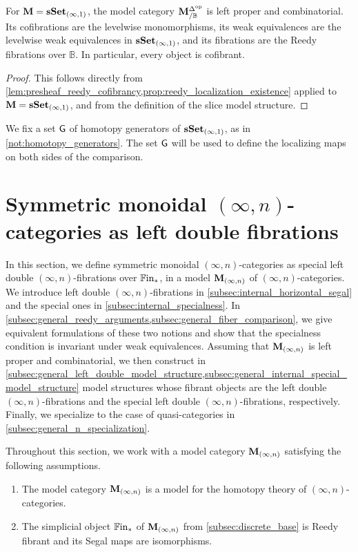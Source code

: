 \documentclass[10pt,reqno]{amsart}
\begin{document}
\begin{proposition}
\label{prop:reedy_quasicategorical_ambient}
For $\mathbf M=\mathbf{sSet}_{(\infty,1)}$, the model category
$\mathbf M^{\Delta^{\mathrm{op}}}_{/\mathbb B}$ is left proper and combinatorial. Its cofibrations
are the levelwise monomorphisms, its weak equivalences are the levelwise
weak equivalences in $\mathbf{sSet}_{(\infty,1)}$, and its fibrations are
the Reedy fibrations over $\mathbb B$. In particular, every object
is cofibrant.
\end{proposition}
\begin{proof}
This follows directly from
\cref{lem:presheaf_reedy_cofibrancy,prop:reedy_localization_existence}
applied to $\mathbf M=\mathbf{sSet}_{(\infty,1)}$, and from the definition
of the slice model structure.
\end{proof}

\begin{notation}
\label{not:joyal_homotopy_generators}
We fix a set $\mathsf G$ of homotopy generators of
$\mathbf{sSet}_{(\infty,1)}$, as in \cref{not:homotopy_generators}. The set
$\mathsf G$ will be used to define the localizing maps on both sides of
the comparison.
\end{notation}


\section{Symmetric monoidal \texorpdfstring{$(\infty,n)$}{(infinity,n)}-categories as left double fibrations}
\label{sec:internal_description}

In this section, we define symmetric monoidal $(\infty,n)$-categories
as special left double $(\infty,n)$-fibrations over $\mathbb{F}\mathrm{in}_*$, in
a model $\mathbf M_{(\infty,n)}$ of $(\infty,n)$-categories. We introduce left
double $(\infty,n)$-fibrations in
\cref{subsec:internal_horizontal_segal} and the special ones in
\cref{subsec:internal_specialness}. In
\cref{subsec:general_reedy_arguments,subsec:general_fiber_comparison},
we give equivalent formulations of these two notions and show that
the specialness condition is invariant under weak equivalences. Assuming that $\mathbf M_{(\infty,n)}$ is
left proper and combinatorial, we then construct in
\cref{subsec:general_left_double_model_structure,subsec:general_internal_special_model_structure}
model structures whose fibrant objects are the left double
$(\infty,n)$-fibrations and the special left double
$(\infty,n)$-fibrations, respectively. Finally, we specialize to
the case of quasi-categories in \cref{subsec:general_n_specialization}.

\begin{hypothesis}%
\label{hyp:internal_standing_assumptions}
Throughout this section, we work with a model category $\mathbf M_{(\infty,n)}$
satisfying the following assumptions.
\begin{enumerate}[label=\textup{(A\arabic*)}]
\item The model category $\mathbf M_{(\infty,n)}$ is a model for the homotopy theory
of $(\infty,n)$-categories.
\item The simplicial object $\mathbb{F}\mathrm{in}_*$ of $\mathbf M_{(\infty,n)}$ from
\cref{subsec:discrete_base} is Reedy fibrant and its Segal maps are
isomorphisms.
\end{enumerate}
\end{hypothesis}
\end{document}
